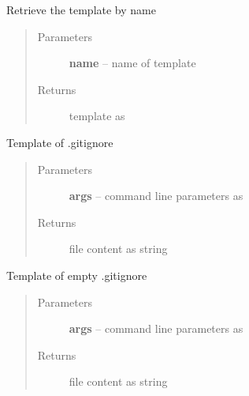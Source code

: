 \documentclass[letterpaper,10pt,english]{sphinxmanual}
\begin{document}

\begin{fulllineitems}
\label{_rst/pyscaffold:pyscaffold.templates.get_template}
Retrieve the template by name
\begin{quote}\begin{description}
\item[{Parameters}] \leavevmode
\textbf{name} -- name of template

\item[{Returns}] \leavevmode
template as \href{http://docs.python.org/2.7/library/string.html\#string.Template}{}

\end{description}\end{quote}

\end{fulllineitems}


\begin{fulllineitems}
\label{_rst/pyscaffold:pyscaffold.templates.gitignore}
Template of .gitignore
\begin{quote}\begin{description}
\item[{Parameters}] \leavevmode
\textbf{args} -- command line parameters as \href{http://docs.python.org/2.7/library/argparse.html\#argparse.Namespace}{}

\item[{Returns}] \leavevmode
file content as string

\end{description}\end{quote}

\end{fulllineitems}


\begin{fulllineitems}
\label{_rst/pyscaffold:pyscaffold.templates.gitignore_empty}
Template of empty .gitignore
\begin{quote}\begin{description}
\item[{Parameters}] \leavevmode
\textbf{args} -- command line parameters as \href{http://docs.python.org/2.7/library/argparse.html\#argparse.Namespace}{}

\item[{Returns}] \leavevmode
file content as string

\end{description}\end{quote}

\end{fulllineitems}
\end{document}
